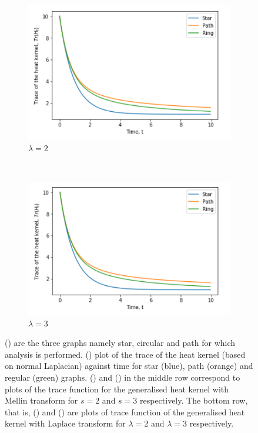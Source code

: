 \documentclass[10pt,a4paper]{article}
\theoremstyle{plain}
\theoremstyle{definition}
\begin{document}
\begin{figure}[H]
\begin{subfigure}[b]{0.45\textwidth}
        		\includegraphics[width= \textwidth]{images/graphskernellaplace2.png}
        		\caption{$\lambda=2$}
        		\label{threegraphLaplace2}
        	\end{subfigure}~
	        \begin{subfigure}[b]{0.45\textwidth}
	        	\includegraphics[width= \textwidth]{images/graphskernellaplace3.png}
	        	\caption{$\lambda=3$}
	        	\label{threegraphLaplace3}
	        \end{subfigure}
        	\caption{() are the three graphs namely star, circular and path for which analysis is performed. () plot of the trace of the heat kernel (based on normal Laplacian) against time for star (blue), path (orange) and regular (green) graphs.
        		() and () in the middle row correspond to plots of the trace function for the generalised heat kernel with Mellin transform for $s=2$ and $s=3$ respectively. The bottom row, that is, () and () are plots of trace function of the generalised heat kernel with Laplace transform for $\lambda=2$ and $\lambda=3$ respectively.}
        	\label{genthreegraphsTraceplots}
        \end{figure}
        
\end{document}
